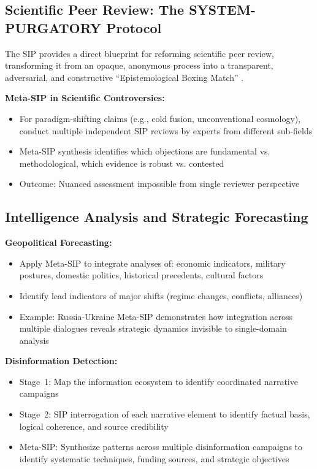 \documentclass[11pt,a4paper]{article}
\begin{document}
\subsection{Scientific Peer Review: The SYSTEM-PURGATORY Protocol}

The SIP provides a direct blueprint for reforming scientific peer review, transforming it from an opaque, anonymous process into a transparent, adversarial, and constructive ``Epistemological Boxing Match'' \citep{KovnatskySVE3}.

\textbf{Meta-SIP in Scientific Controversies:}
\begin{itemize}[nosep]
    \item For paradigm-shifting claims (e.g., cold fusion, unconventional cosmology), conduct multiple independent SIP reviews by experts from different sub-fields
    \item Meta-SIP synthesis identifies which objections are fundamental vs. methodological, which evidence is robust vs. contested
    \item Outcome: Nuanced assessment impossible from single reviewer perspective
\end{itemize}

\subsection{Intelligence Analysis and Strategic Forecasting}

\textbf{Geopolitical Forecasting:}
\begin{itemize}[nosep]
    \item Apply Meta-SIP to integrate analyses of: economic indicators, military postures, domestic politics, historical precedents, cultural factors
    \item Identify lead indicators of major shifts (regime changes, conflicts, alliances)
    \item Example: Russia-Ukraine Meta-SIP demonstrates how integration across multiple dialogues reveals strategic dynamics invisible to single-domain analysis
\end{itemize}

\textbf{Disinformation Detection:}
\begin{itemize}[nosep]
    \item Stage~1: Map the information ecosystem to identify coordinated narrative campaigns
    \item Stage~2: SIP interrogation of each narrative element to identify factual basis, logical coherence, and source credibility
    \item Meta-SIP: Synthesize patterns across multiple disinformation campaigns to identify systematic techniques, funding sources, and strategic objectives
\end{itemize}
\end{document}
